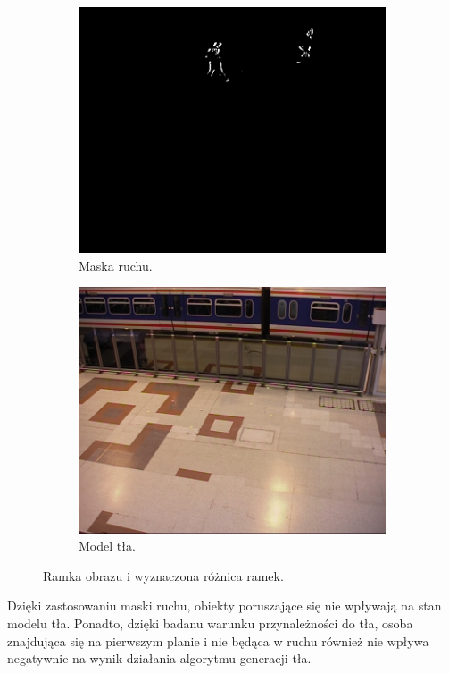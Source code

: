 \begin{figure}[H]
	\begin{subfigure}[b]{0.49\textwidth}
		\includegraphics[width=\textwidth]{img/bg-mo.png}
		\caption{Maska ruchu.}
	\end{subfigure}
	\hfill
	\begin{subfigure}[b]{0.49\textwidth}
		\includegraphics[width=\textwidth]{img/bg-model.png}
		\caption{Model tła.}
	\end{subfigure}
	\caption{Ramka obrazu i wyznaczona różnica ramek.}
	\label{fig:background-model-result}
\end{figure}

Dzięki zastosowaniu maski ruchu, obiekty poruszające się nie wpływają na stan modelu tła. Ponadto, dzięki badanu warunku przynależności do tła, osoba znajdująca się na pierwszym planie i nie będąca w ruchu również nie wpływa negatywnie na wynik działania algorytmu generacji tła.

